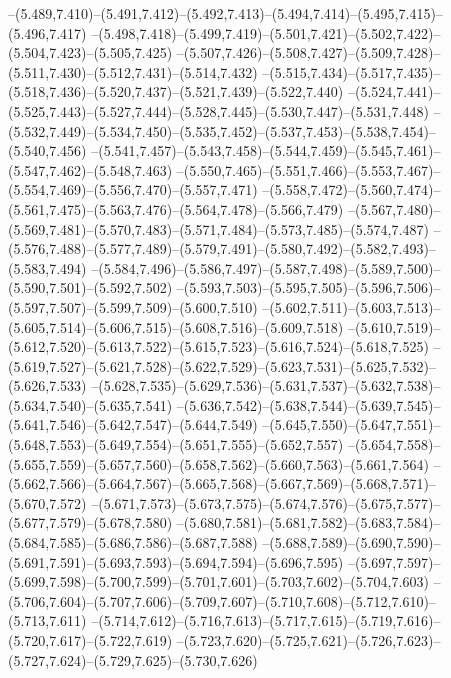  --(5.489,7.410)--(5.491,7.412)--(5.492,7.413)--(5.494,7.414)--(5.495,7.415)--(5.496,7.417)%
  --(5.498,7.418)--(5.499,7.419)--(5.501,7.421)--(5.502,7.422)--(5.504,7.423)--(5.505,7.425)%
  --(5.507,7.426)--(5.508,7.427)--(5.509,7.428)--(5.511,7.430)--(5.512,7.431)--(5.514,7.432)%
  --(5.515,7.434)--(5.517,7.435)--(5.518,7.436)--(5.520,7.437)--(5.521,7.439)--(5.522,7.440)%
  --(5.524,7.441)--(5.525,7.443)--(5.527,7.444)--(5.528,7.445)--(5.530,7.447)--(5.531,7.448)%
  --(5.532,7.449)--(5.534,7.450)--(5.535,7.452)--(5.537,7.453)--(5.538,7.454)--(5.540,7.456)%
  --(5.541,7.457)--(5.543,7.458)--(5.544,7.459)--(5.545,7.461)--(5.547,7.462)--(5.548,7.463)%
  --(5.550,7.465)--(5.551,7.466)--(5.553,7.467)--(5.554,7.469)--(5.556,7.470)--(5.557,7.471)%
  --(5.558,7.472)--(5.560,7.474)--(5.561,7.475)--(5.563,7.476)--(5.564,7.478)--(5.566,7.479)%
  --(5.567,7.480)--(5.569,7.481)--(5.570,7.483)--(5.571,7.484)--(5.573,7.485)--(5.574,7.487)%
  --(5.576,7.488)--(5.577,7.489)--(5.579,7.491)--(5.580,7.492)--(5.582,7.493)--(5.583,7.494)%
  --(5.584,7.496)--(5.586,7.497)--(5.587,7.498)--(5.589,7.500)--(5.590,7.501)--(5.592,7.502)%
  --(5.593,7.503)--(5.595,7.505)--(5.596,7.506)--(5.597,7.507)--(5.599,7.509)--(5.600,7.510)%
  --(5.602,7.511)--(5.603,7.513)--(5.605,7.514)--(5.606,7.515)--(5.608,7.516)--(5.609,7.518)%
  --(5.610,7.519)--(5.612,7.520)--(5.613,7.522)--(5.615,7.523)--(5.616,7.524)--(5.618,7.525)%
  --(5.619,7.527)--(5.621,7.528)--(5.622,7.529)--(5.623,7.531)--(5.625,7.532)--(5.626,7.533)%
  --(5.628,7.535)--(5.629,7.536)--(5.631,7.537)--(5.632,7.538)--(5.634,7.540)--(5.635,7.541)%
  --(5.636,7.542)--(5.638,7.544)--(5.639,7.545)--(5.641,7.546)--(5.642,7.547)--(5.644,7.549)%
  --(5.645,7.550)--(5.647,7.551)--(5.648,7.553)--(5.649,7.554)--(5.651,7.555)--(5.652,7.557)%
  --(5.654,7.558)--(5.655,7.559)--(5.657,7.560)--(5.658,7.562)--(5.660,7.563)--(5.661,7.564)%
  --(5.662,7.566)--(5.664,7.567)--(5.665,7.568)--(5.667,7.569)--(5.668,7.571)--(5.670,7.572)%
  --(5.671,7.573)--(5.673,7.575)--(5.674,7.576)--(5.675,7.577)--(5.677,7.579)--(5.678,7.580)%
  --(5.680,7.581)--(5.681,7.582)--(5.683,7.584)--(5.684,7.585)--(5.686,7.586)--(5.687,7.588)%
  --(5.688,7.589)--(5.690,7.590)--(5.691,7.591)--(5.693,7.593)--(5.694,7.594)--(5.696,7.595)%
  --(5.697,7.597)--(5.699,7.598)--(5.700,7.599)--(5.701,7.601)--(5.703,7.602)--(5.704,7.603)%
  --(5.706,7.604)--(5.707,7.606)--(5.709,7.607)--(5.710,7.608)--(5.712,7.610)--(5.713,7.611)%
  --(5.714,7.612)--(5.716,7.613)--(5.717,7.615)--(5.719,7.616)--(5.720,7.617)--(5.722,7.619)%
  --(5.723,7.620)--(5.725,7.621)--(5.726,7.623)--(5.727,7.624)--(5.729,7.625)--(5.730,7.626)%

